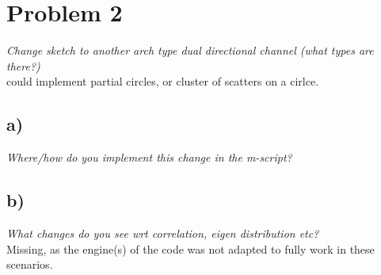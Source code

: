\section{Problem 2}
\textit{Change sketch to another arch type dual directional channel (what types are there?)}\\

could implement partial circles, or cluster of scatters on a cirlce.

\subsection{a)}
\textit{Where/how do you implement this change in the m-script?}\\



\subsection{b)}
\textit{What changes do you see wrt correlation, eigen distribution etc?}\\

Missing, as the engine(s) of the code was not adapted to fully work in these scenarios.